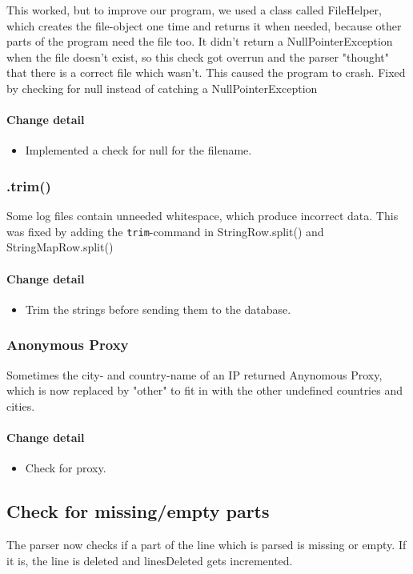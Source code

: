 This worked, but to improve our program, we used a class called FileHelper, which creates the file-object one time and
returns it when needed, because other parts of the program need the file too. It didn't return a NullPointerException when 
the file doesn't exist, so this check got overrun and the parser "thought" that there is a correct file which wasn't.
This caused the program to crash. Fixed by checking for null instead of catching a NullPointerException


\paragraph{Change detail}
\begin{itemize}
  \item Implemented a check for null for the filename.
\end{itemize}

\subsubsection{.trim()}
Some log files contain unneeded whitespace, which produce incorrect data. 
This was fixed by adding the \texttt{trim}-command in StringRow.split() and StringMapRow.split()


\paragraph{Change detail}
\begin{itemize}
  \item Trim the strings before sending them to the database.
\end{itemize}

\subsubsection{Anonymous Proxy}
Sometimes the city- and country-name of an IP returned Anynomous Proxy, which is now replaced by "other" to fit in with 
the other undefined countries and cities.


\paragraph{Change detail}
\begin{itemize}
  \item Check for proxy.
\end{itemize}

\subsection{Check for missing/empty parts}
The parser now checks if a part of the line which is parsed is missing or empty. If it is, the line is deleted and 
linesDeleted gets incremented.

